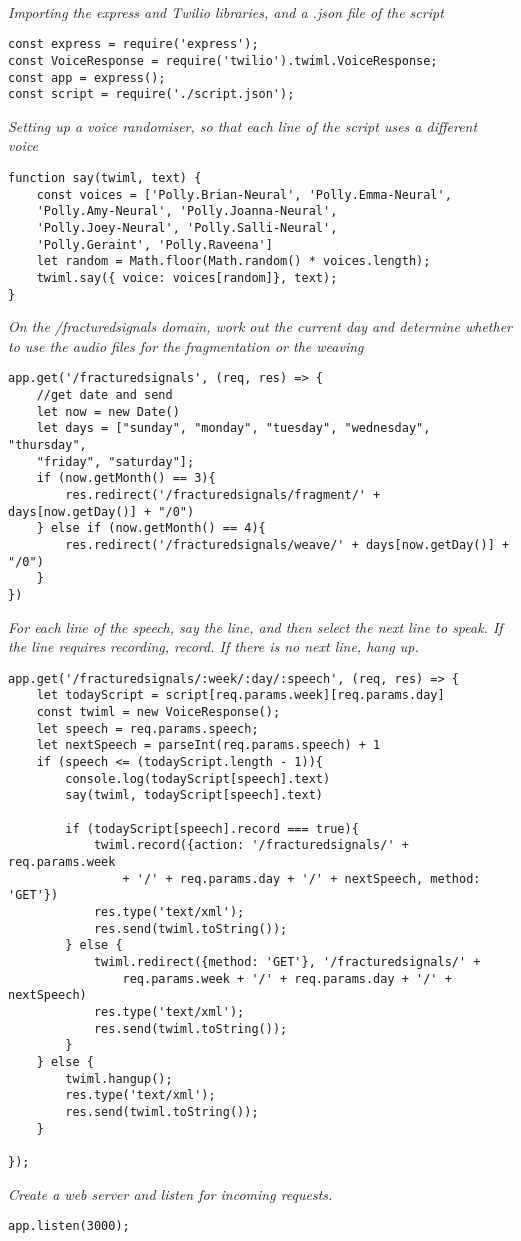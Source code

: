 \textit{\\Importing the express and Twilio libraries, and a .json file of the script}
\begin{verbatim}
const express = require('express');
const VoiceResponse = require('twilio').twiml.VoiceResponse;
const app = express();
const script = require('./script.json');
\end{verbatim}
\textit{Setting up a voice randomiser, so that each line of the script uses a different voice}
\begin{verbatim}
function say(twiml, text) {
    const voices = ['Polly.Brian-Neural', 'Polly.Emma-Neural', 
    'Polly.Amy-Neural', 'Polly.Joanna-Neural', 
    'Polly.Joey-Neural', 'Polly.Salli-Neural', 
    'Polly.Geraint', 'Polly.Raveena']
    let random = Math.floor(Math.random() * voices.length);
    twiml.say({ voice: voices[random]}, text);
}
\end{verbatim}
\textit{On the /fracturedsignals domain, work out the current day and determine whether to use the audio files for the fragmentation or the weaving}
\begin{verbatim}
app.get('/fracturedsignals', (req, res) => {
    //get date and send
    let now = new Date()
    let days = ["sunday", "monday", "tuesday", "wednesday", "thursday",
    "friday", "saturday"];
    if (now.getMonth() == 3){
        res.redirect('/fracturedsignals/fragment/' + days[now.getDay()] + "/0")
    } else if (now.getMonth() == 4){
        res.redirect('/fracturedsignals/weave/' + days[now.getDay()] + "/0")
    }
})
\end{verbatim}
\textit{For each line of the speech, say the line, and then select the next line to speak. If the line requires recording, record. If there is no next line, hang up.}
\begin{verbatim}   
app.get('/fracturedsignals/:week/:day/:speech', (req, res) => {
    let todayScript = script[req.params.week][req.params.day]
    const twiml = new VoiceResponse();
    let speech = req.params.speech;
    let nextSpeech = parseInt(req.params.speech) + 1
    if (speech <= (todayScript.length - 1)){
        console.log(todayScript[speech].text)
        say(twiml, todayScript[speech].text)

        if (todayScript[speech].record === true){
            twiml.record({action: '/fracturedsignals/' + req.params.week
                + '/' + req.params.day + '/' + nextSpeech, method: 'GET'})
            res.type('text/xml');
            res.send(twiml.toString());
        } else {
            twiml.redirect({method: 'GET'}, '/fracturedsignals/' + 
                req.params.week + '/' + req.params.day + '/' + nextSpeech)
            res.type('text/xml');
            res.send(twiml.toString());          
        }
    } else {
        twiml.hangup();
        res.type('text/xml');
        res.send(twiml.toString());      
    }
        
});
\end{verbatim}
\textit{Create a web server and listen for incoming requests.}
\begin{verbatim}
app.listen(3000);
\end{verbatim}
